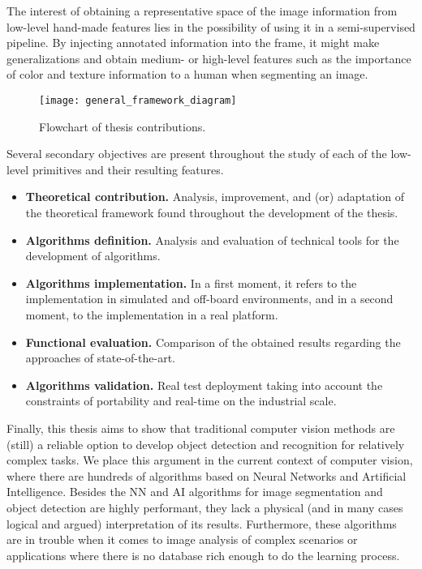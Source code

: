 The interest of obtaining a representative space of the image information from low-level hand-made features lies in the possibility of using it in a semi-supervised pipeline. By injecting annotated information into the frame, it might make generalizations and obtain medium- or high-level features such as the importance of color and texture information to a human when segmenting an image. 

\begin{figure}[!ht]
    \centering
    \texttt{[image: general\_framework\_diagram]}        
    \caption{Flowchart of thesis contributions.}\label{fig:general_diagram_framework}
\end{figure}

Several secondary objectives are present throughout the study of each of the low-level primitives and their resulting features.

\begin{itemize}
	\item \textbf{Theoretical contribution.} Analysis, improvement, and (or) adaptation of the theoretical framework found throughout the development of the thesis.
	\item \textbf{Algorithms definition.} Analysis and evaluation of technical tools for the development of algorithms.
	\item \textbf{Algorithms implementation.} In a first moment, it refers to the implementation in simulated and off-board environments, and in a second moment, to the implementation in a real platform.
	\item \textbf{Functional evaluation.} Comparison of the obtained results regarding the approaches of state-of-the-art. 
 	\item \textbf{Algorithms validation.} Real test deployment taking into account the constraints of portability and real-time on the industrial scale.
 
\end{itemize}

Finally, this thesis aims to show that traditional computer vision methods are (still) a reliable option to develop object detection and recognition for relatively complex tasks. We place this argument in the current context of computer vision, where there are hundreds of algorithms based on Neural Networks and Artificial Intelligence. Besides the NN and AI algorithms for image segmentation and object detection are highly performant, they lack a physical (and in many cases logical and argued) interpretation of its results. Furthermore, these algorithms are in trouble when it comes to image analysis of complex scenarios or applications where there is no database rich enough to do the learning process.


